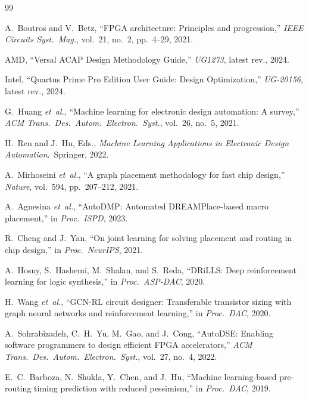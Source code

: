 \documentclass[journal,onecolumn=false]{IEEEtran}
\begin{document}
\begin{thebibliography}{99}
\footnotesize

A.~Boutros and V.~Betz, ``FPGA architecture: Principles and progression,'' \emph{IEEE Circuits Syst.\ Mag.}, vol.~21, no.~2, pp.~4--29, 2021.

AMD, ``Versal ACAP Design Methodology Guide,'' \emph{UG1273}, latest rev., 2024.

Intel, ``Quartus Prime Pro Edition User Guide: Design Optimization,'' \emph{UG-20156}, latest rev., 2024.

G.~Huang \emph{et~al.}, ``Machine learning for electronic design automation: A survey,'' \emph{ACM Trans.\ Des.\ Autom.\ Electron.\ Syst.}, vol.~26, no.~5, 2021.

H.~Ren and J.~Hu, Eds., \emph{Machine Learning Applications in Electronic Design Automation}.\ Springer, 2022.

A.~Mirhoseini \emph{et~al.}, ``A graph placement methodology for fast chip design,'' \emph{Nature}, vol.~594, pp.~207--212, 2021.

A.~Agnesina \emph{et~al.}, ``AutoDMP: Automated DREAMPlace-based macro placement,'' in \emph{Proc.\ ISPD}, 2023.

R.~Cheng and J.~Yan, ``On joint learning for solving placement and routing in chip design,'' in \emph{Proc.\ NeurIPS}, 2021.

A.~Hosny, S.~Hashemi, M.~Shalan, and S.~Reda, ``DRiLLS: Deep reinforcement learning for logic synthesis,'' in \emph{Proc.\ ASP-DAC}, 2020.

H.~Wang \emph{et~al.}, ``GCN-RL circuit designer: Transferable transistor sizing with graph neural networks and reinforcement learning,'' in \emph{Proc.\ DAC}, 2020.

A.~Sohrabizadeh, C.~H.~Yu, M.~Gao, and J.~Cong, ``AutoDSE: Enabling software programmers to design efficient FPGA accelerators,'' \emph{ACM Trans.\ Des.\ Autom.\ Electron.\ Syst.}, vol.~27, no.~4, 2022.

E.~C.~Barboza, N.~Shukla, Y.~Chen, and J.~Hu, ``Machine learning-based pre-routing timing prediction with reduced pessimism,'' in \emph{Proc.\ DAC}, 2019.


\end{thebibliography}
\end{document}
